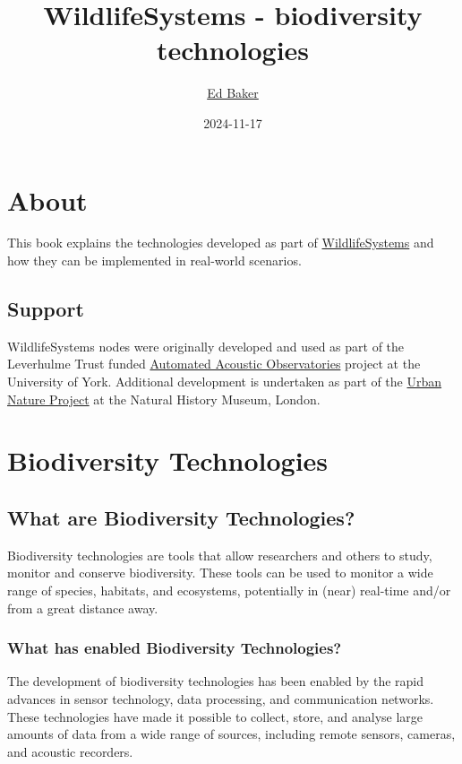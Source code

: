 \documentclass[
]{book}
\title{WildlifeSystems - biodiversity technologies}
\author{\href{https://ebaker.me.uk}{Ed Baker}}
\date{2024-11-17}
\begin{document}
\maketitle

{
\setcounter{tocdepth}{1}
\tableofcontents
}
\chapter*{About}\label{about}

This book explains the technologies developed as part of \href{https://wildlife.systems}{WildlifeSystems} and how they can be implemented in real-world scenarios.

\section*{Support}\label{support}

WildlifeSystems nodes were originally developed and used as part of the Leverhulme Trust funded \href{https://ebaker.me.uk/aao}{Automated Acoustic Observatories} project at the University of York. Additional development is undertaken as part of the \href{https://www.nhm.ac.uk/about-us/urban-nature-project.html}{Urban Nature Project} at the Natural History Museum, London.

\chapter{Biodiversity Technologies}\label{biodiversity-technologies}

\section{What are Biodiversity Technologies?}\label{what-are-biodiversity-technologies}

Biodiversity technologies are tools that allow researchers and others to study, monitor and
conserve biodiversity. These tools can be used to monitor a wide range of species, habitats, and ecosystems, potentially in (near) real-time and/or from a great distance away.

\subsection{What has enabled Biodiversity Technologies?}\label{what-has-enabled-biodiversity-technologies}

The development of biodiversity technologies has been enabled by the rapid advances in sensor technology, data processing, and communication networks. These technologies have made it possible to collect, store, and analyse large amounts of data from a wide range of sources, including remote sensors, cameras, and acoustic recorders.
\end{document}

